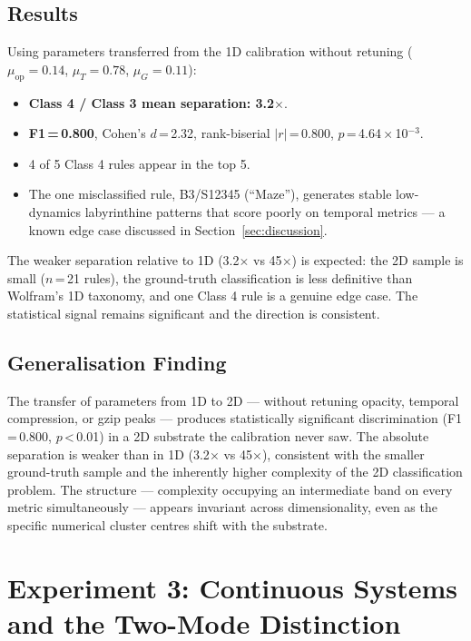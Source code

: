 \documentclass[12pt,a4paper]{article}
\begin{document}
\subsection{Results}

Using parameters transferred from the 1D calibration without retuning
($\mu_\text{op} = 0.14$, $\mu_T = 0.78$, $\mu_G = 0.11$):

\begin{itemize}[noitemsep]
  \item \textbf{Class 4 / Class 3 mean separation: 3.2$\times$}.
  \item \textbf{F1\,=\,0.800}, Cohen's $d$\,=\,2.32,
        rank-biserial $|r|$\,=\,0.800, $p$\,=\,4.64\,×\,10$^{-3}$.
  \item 4 of 5 Class 4 rules appear in the top 5.
  \item The one misclassified rule, B3/S12345 (``Maze''), generates
        stable low-dynamics labyrinthine patterns that score poorly on
        temporal metrics — a known edge case discussed in Section~\ref{sec:discussion}.
\end{itemize}

The weaker separation relative to 1D (3.2$\times$ vs 45$\times$) is
expected: the 2D sample is small ($n$\,=\,21 rules), the ground-truth
classification is less definitive than Wolfram's 1D taxonomy, and one
Class 4 rule is a genuine edge case.
The statistical signal remains significant and the direction is
consistent.

\subsection{Generalisation Finding}

The transfer of parameters from 1D to 2D — without retuning opacity,
temporal compression, or gzip peaks — produces statistically significant
discrimination (F1\,=\,0.800, $p$\,<\,0.01) in a 2D substrate the
calibration never saw.
The absolute separation is weaker than in 1D (3.2$\times$ vs 45$\times$),
consistent with the smaller ground-truth sample and the inherently
higher complexity of the 2D classification problem.
The structure — complexity occupying an intermediate band on every
metric simultaneously — appears invariant across dimensionality, even
as the specific numerical cluster centres shift with the substrate.

\section{Experiment 3: Continuous Systems and the Two-Mode Distinction}
\end{document}
